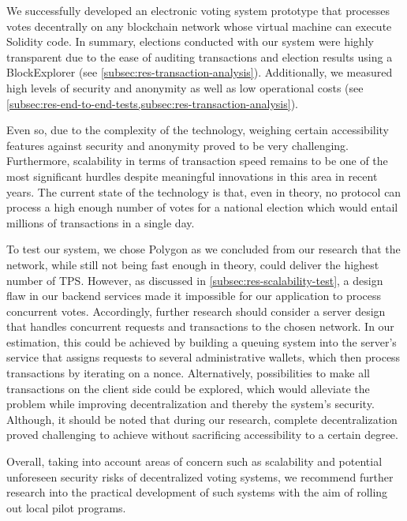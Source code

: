 We successfully developed an electronic voting system prototype that processes votes decentrally on any blockchain network whose virtual machine can execute Solidity code.
In summary, elections conducted with our system were highly transparent due to the ease of auditing transactions and election results using a \gls{BlockExplorer} (see \cref{subsec:res-transaction-analysis}).
Additionally, we measured high levels of security and anonymity as well as low operational costs (see \cref{subsec:res-end-to-end-tests,subsec:res-transaction-analysis}).

Even so, due to the complexity of the technology, weighing certain accessibility features against security and anonymity proved to be very challenging.
Furthermore, scalability in terms of transaction speed remains to be one of the most significant hurdles despite meaningful innovations in this area in recent years.
The current state of the technology is that, even in theory, no protocol can process a high enough number of votes for a national election which would entail millions of transactions in a single day.

To test our system, we chose Polygon as we concluded from our research that the network, while still not being fast enough in theory, could deliver the highest number of \gls{TPS}.
However, as discussed in \cref{subsec:res-scalability-test}, a design flaw in our backend services made it impossible for our application to process concurrent votes.
Accordingly, further research should consider a server design that handles concurrent requests and transactions to the chosen network.
In our estimation, this could be achieved by building a queuing system into the server’s service that assigns requests to several administrative wallets, which then process transactions by iterating on a nonce.
Alternatively, possibilities to make all transactions on the client side could be explored, which would alleviate the problem while improving decentralization and thereby the system’s security.
Although, it should be noted that during our research, complete decentralization proved challenging to achieve without sacrificing accessibility to a certain degree.

Overall, taking into account areas of concern such as scalability and potential unforeseen security risks of decentralized voting systems, we recommend further research into the practical development of such systems with the aim of rolling out local pilot programs.